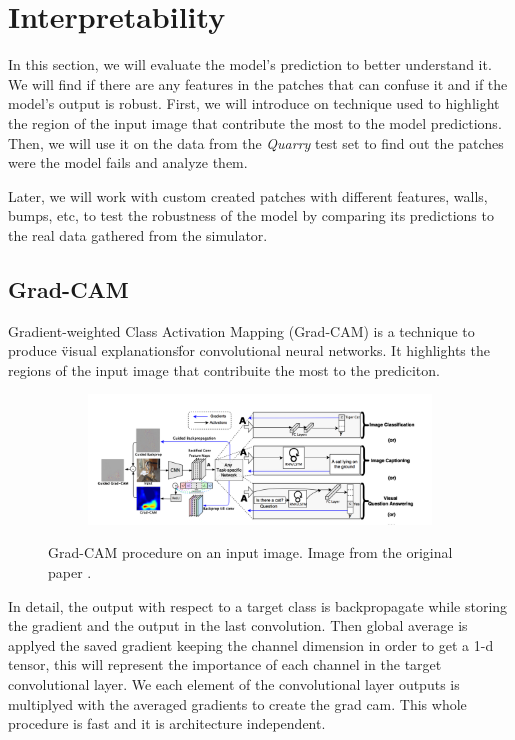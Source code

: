 \documentclass[../document.tex]{subfiles}
\begin{document}
\chapter{Interpretability}
\label{chap: interpretability}
In this section, we will evaluate the model's prediction to better understand it. We will find if there are any features in the patches that can confuse it and if the model's output is robust.
First, we will introduce on technique used to highlight the region of the input image that contribute the most to the model predictions. Then, we will use it on the data from the \emph{Quarry} test set to find out the patches were the model fails and analyze them.

Later, we will work with custom created patches with different features, walls, bumps, etc, to test the robustness of the model by comparing its predictions to the real data gathered from the simulator.

\section{Grad-CAM}
Gradient-weighted Class Activation Mapping (Grad-CAM) \cite{gradcam} is a technique to produce \"visual explanations\" for convolutional neural networks. It highlights the regions of the input image that contribuite the most to the prediciton. 
\begin{figure}[H]
    \centering
    \begin{subfigure}[b]{1\textwidth}
        \includegraphics[width=\linewidth]{../img/5/grad_cam1.png}
    \end{subfigure}
\caption{Grad-CAM procedure on an input image. Image from the original paper \cite{gradcam}.}
\end{figure}
In detail, the output with respect to a target class is backpropagate while storing the gradient and the output in the last convolution. Then global average is applyed the saved gradient keeping the channel dimension in order to get a 1-d tensor, this will represent the importance of each channel in the target convolutional layer. We  each element of the convolutional layer outputs is multiplyed with the averaged gradients to create the grad cam. This whole procedure is fast and it is architecture independent.



\end{document}
